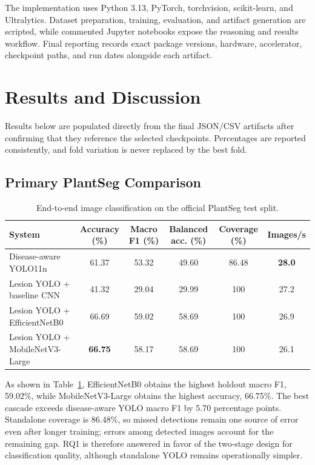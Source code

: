 \documentclass[conference]{IEEEtran}
\newcommand{\ppoints}{percentage points}
\begin{document}
The implementation uses Python 3.13, PyTorch, torchvision, scikit-learn, and Ultralytics. Dataset
preparation, training, evaluation, and artifact generation are scripted, while commented Jupyter
notebooks expose the reasoning and results workflow. Final reporting records exact package versions,
hardware, accelerator, checkpoint paths, and run dates alongside each artifact.

\section{Results and Discussion}

Results below are populated directly from the final JSON/CSV artifacts after confirming that they
reference the selected checkpoints. Percentages are reported consistently, and fold variation is
never replaced by the best fold.

\subsection{Primary PlantSeg Comparison}

\begin{table}[t]
\caption{End-to-end image classification on the official PlantSeg test split.}
\label{tab:primary-results}
\centering
\begin{tabular}{lccccc}
\toprule
System & Accuracy (\%) & Macro F1 (\%) & Balanced acc. (\%) & Coverage (\%) & Images/s \\
\midrule
Disease-aware YOLO11n & 61.37 & 53.32 & 49.60 & 86.48 & \textbf{28.0} \\
Lesion YOLO + baseline CNN & 41.32 & 29.04 & 29.99 & 100 & 27.2 \\
Lesion YOLO + EfficientNetB0 & 66.69 & 59.02 & 58.69 & 100 & 26.9 \\
Lesion YOLO + MobileNetV3-Large & \textbf{66.75} & 58.17 & 58.69 & 100 & 26.1 \\
\bottomrule
\end{tabular}
\end{table}

As shown in Table~\ref{tab:primary-results}, EfficientNetB0 obtains the highest holdout macro F1,
59.02\%, while MobileNetV3-Large obtains the highest accuracy, 66.75\%. The best cascade exceeds
disease-aware YOLO macro F1 by 5.70 \ppoints. Standalone coverage is 86.48\%, so missed detections
remain one source of error even after longer training; errors among detected images account for the
remaining gap. RQ1 is therefore answered in favor of the two-stage design for classification
quality, although standalone YOLO remains operationally simpler.
\end{document}

